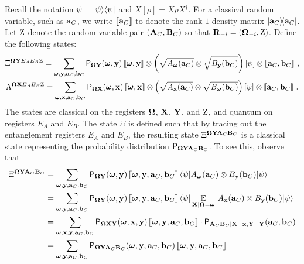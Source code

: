 Recall the notation $\psi = \ket{\psi}\bra{\psi}$ and $X[\rho]=X\rho X^\dagger$. For a classical random variable, such as $\ba_C$, we write $\puretomixed{\ba_C}$ to denote the rank-$1$ density matrix $\ketbra{\ba_C}{\ba_C}$. Let $\ac$ denote the random variable pair $(\bA_C, \bB_C)$ so that $\bR_\mi = (\bOmega_\mi,\ac)$. Define the following states:
\begin{gather}
\Xi^{\bOmega \bY E_AE_B\ac} = \sum_{\bomega, \by, \ba_C, \bb_C} \P_{\bOmega \bY} (\bomega, \by) \, \puretomixed{\bomega, \by}   \otimes \left (\sqrt{A_{\bomega}(\ba_C)} \otimes \sqrt{B_{\by}(\bb_C)} \right ) \left [\psi \right ] \otimes \puretomixed{\ba_C, \bb_C}~, \label{eq:Xi-def} \\
\Lambda^{\bOmega \bX E_AE_B\ac} = \sum_{\bomega, \bx, \ba_C, \bb_C} \P_{\bOmega \bX} (\bomega, \bx) \, \puretomixed{\bomega, \bx}   \otimes \left (\sqrt{A_{\bx}(\ba_C)} \otimes \sqrt{B_{\bomega}(\bb_C)} \right ) \left [\psi \right ] \otimes \puretomixed{\ba_C, \bb_C}~. \label{eq:Lambda-def}
\end{gather}
The states are classical on the registers $\bOmega$, $\bX$, $\bY$, and $\ac$, and quantum on registers $E_A$ and $E_B$. %
The state $\Xi$ is defined such that by tracing out the entanglement registers $E_A$ and $E_B$, the resulting state $\Xi^{\bOmega \bY \bA_C \bB_C}$ is a classical state representing the probability distribution $\P_{\bOmega \bY \bA_C \bB_C}$. To see this, observe that
\begin{align*}
\Xi^{\bOmega \bY \bA_C \bB_C} &= \sum_{\bomega, \by, \ba_C, \bb_C} \P_{\bOmega \bY}(\bomega, \by) \, \puretomixed{\bomega, \by, \ba_C, \bb_C} \, \bra{\psi} A_\bomega(\ba_C) \otimes B_\by(\bb_C) \ket{\psi} \\
&= \sum_{\bomega, \by, \ba_C, \bb_C} \P_{\bOmega \bY}(\bomega, \by) \, \puretomixed{\bomega, \by, \ba_C, \bb_C} \, \bra{\psi} \Ex_{\bX | \bOmega = \bomega} \, A_\bx(\ba_C)  \otimes B_\by(\bb_C) \ket{\psi} \\
&= \sum_{\bomega, \bx, \by, \ba_C, \bb_C} \P_{\bOmega \bX \bY}(\bomega, \bx, \by) \, \puretomixed{\bomega, \by, \ba_C, \bb_C} \cdot \P_{\bA_C \bB_C | \bX = \bx, \bY = \bY}(\ba_C,\bb_C) \\
&= \sum_{\bomega,\by, \ba_C, \bb_C} \P_{\bOmega\bY \bA_C \bB_C}(\bomega, \by, \ba_C,\bb_C) \, \puretomixed{\bomega, \by, \ba_C, \bb_C}
\end{align*}
